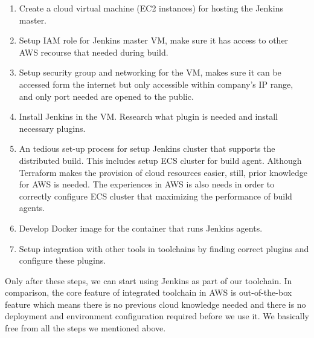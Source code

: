 \begin{enumerate} 
    \item Create a cloud virtual machine (EC2 instances) for hosting the Jenkins master.
    \item Setup IAM role for Jenkins master VM, make sure it has access to other AWS recourse that needed during build.
    \item Setup security group and networking for the VM, makes sure it can be accessed form the internet but only accessible within company's IP range, and only port needed are opened to the public.
    \item Install Jenkins in the VM. Research what plugin is needed and install necessary plugins.
    \item An tedious set-up process for setup Jenkins cluster that supports the distributed build. This includes setup ECS cluster for build agent. Although Terraform makes the provision of cloud resources easier, still, prior knowledge for AWS is needed. The experiences in AWS is also needs in order to correctly configure ECS cluster that maximizing the performance of build agents.
    \item Develop Docker image for the container that runs Jenkins agents.
    \item Setup integration with other tools in toolchains by finding correct plugins and configure these plugins. 
\end{enumerate}
Only after these steps, we can start using Jenkins as part of our toolchain.
In comparison, the core feature of integrated toolchain in AWS is out-of-the-box feature which means there is no previous cloud knowledge needed and there is no deployment and environment configuration required before we use it. We basically free from all the steps we mentioned above.
